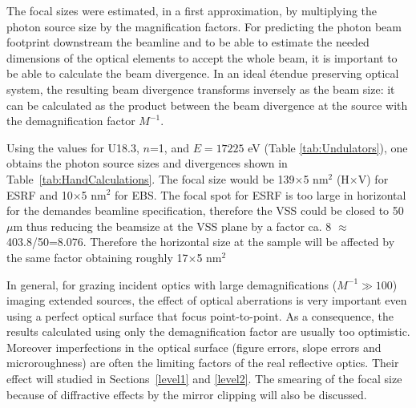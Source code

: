 \documentclass{iucr}              %
\newcommand{\inred}[1]{{\color{red}#1}}
\begin{document}

The focal sizes were estimated, in a first approximation, by multiplying the photon source size by the magnification factors. For predicting the photon beam footprint downstream the beamline and to be able to estimate the needed dimensions of the optical elements to accept the whole beam, it is important to be able to calculate the beam divergence. In an ideal {\'{e}}tendue preserving optical system, the resulting beam divergence transforms inversely as the beam size: it can be calculated as the product between the beam divergence at the source with the demagnification factor $M^{-1}$.

Using the values for U18.3, $n$=1, and  $E=17225$ eV (Table \ref{tab:Undulators}), one obtains the photon source sizes and divergences shown in Table~\ref{tab:HandCalculations}. The focal size would be 139$\times$5 nm$^2$ (H$\times$V) for ESRF and 10$\times$5 nm$^2$ for EBS. The focal spot for ESRF is too large in horizontal for the demandes beamline specification, therefore the VSS could be closed to 50$\mu$m thus reducing the beamsize at the VSS plane by a factor ca. 8 \inred{$\approx$ 403.8/50=8.076}. Therefore the horizontal size at the sample will be affected by the same factor obtaining roughly 17$\times$5 nm$^2$

In general, for grazing incident optics with large demagnifications ($M^{-1} \gg 100$) imaging extended sources, the effect of optical aberrations is very important even using a perfect optical surface that focus point-to-point. As a consequence, the results calculated using only the demagnification factor are usually too optimistic. Moreover imperfections in the optical surface (figure errors, slope errors and microroughness) are often the limiting factors of the real reflective optics. Their effect will studied in Sections~\ref{level1} and \ref{level2}. The smearing of the focal size because of diffractive effects by the mirror clipping will also be discussed. 
\end{document}
